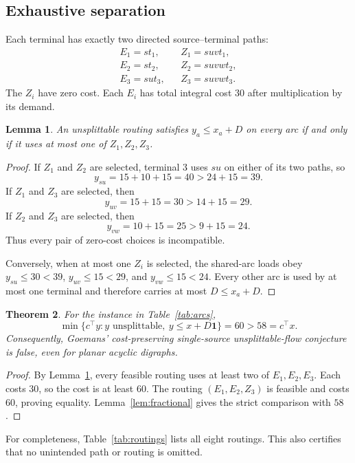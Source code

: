 \documentclass[11pt]{article}
\newtheorem{theorem}{Theorem}[section]
\newtheorem{lemma}[theorem]{Lemma}
\theoremstyle{definition}
\newcommand{\one}{\mathbf{1}}
\begin{document}
\subsection{Exhaustive separation}

Each terminal has exactly two directed source--terminal paths:
\[
\begin{array}{lll}
 E_1=st_1, && Z_1=suvt_1,\\
 E_2=st_2, && Z_2=suvwt_2,\\
 E_3=sut_3,&& Z_3=suvwt_3.
\end{array}
\]
The $Z_i$ have zero cost.  Each $E_i$ has total integral cost $30$ after
multiplication by its demand.

\begin{lemma}\label{lem:good-characterization}
An unsplittable routing satisfies $y_a\le x_a+D$ on every arc if and only if it
uses at most one of $Z_1,Z_2,Z_3$.
\end{lemma}
\begin{proof}
If $Z_1$ and $Z_2$ are selected, terminal $3$ uses $su$ on either of its two
paths, so
\[
 y_{su}=15+10+15=40>24+15=39.
\]
If $Z_1$ and $Z_3$ are selected, then
\[
 y_{uv}=15+15=30>14+15=29.
\]
If $Z_2$ and $Z_3$ are selected, then
\[
 y_{vw}=10+15=25>9+15=24.
\]
Thus every pair of zero-cost choices is incompatible.

Conversely, when at most one $Z_i$ is selected, the shared-arc loads obey
$y_{su}\le30<39$, $y_{uv}\le15<29$, and $y_{vw}\le15<24$.  Every other arc is
used by at most one terminal and therefore carries at most $D\le x_a+D$.
\end{proof}

\begin{theorem}\label{thm:dgg-counterexample}
For the instance in Table~\ref{tab:arcs},
\[
 \min\{c^\top y:y\text{ unsplittable},\ y\le x+D\one\}=60>58=c^\top x.
\]
Consequently, Goemans' cost-preserving single-source unsplittable-flow
conjecture is false, even for planar acyclic digraphs.
\end{theorem}
\begin{proof}
By Lemma~\ref{lem:good-characterization}, every feasible routing uses at least
two of $E_1,E_2,E_3$.  Each costs $30$, so the cost is at least $60$.
The routing $(E_1,E_2,Z_3)$ is feasible and costs $60$, proving equality.
Lemma~\ref{lem:fractional} gives the strict comparison with $58$.
\end{proof}

For completeness, Table~\ref{tab:routings} lists all eight routings.  This
also certifies that no unintended path or routing is omitted.
\end{document}
